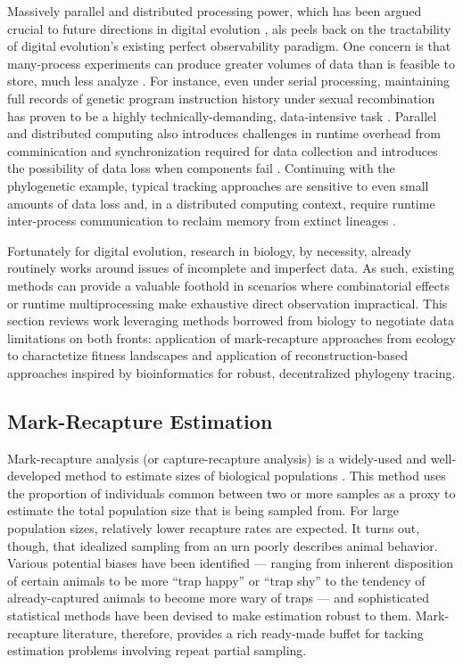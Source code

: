 Massively parallel and distributed processing power, which has been argued crucial to future directions in digital evolution \citep{moreno2022best,ackleyTODO}, als peels back on the tractability of digital evolution's existing perfect observability paradigm.
One concern is that many-process experiments can produce greater volumes of data than is feasible to store, much less analyze \citep{klasky2021data}.
For instance, even under serial processing, maintaining full records of genetic program instruction history under sexual recombination has proven to be a highly technically-demanding, data-intensive task \citep{mcphee2016using}.
Parallel and distributed computing also introduces challenges in runtime overhead from comminication and synchronization required for data collection and introduces the possibility of data loss when components fail \citep{snir2014addressing}.
Continuing with the phylogenetic example, typical tracking approaches are sensitive to even small amounts of data loss and, in a distributed computing context, require runtime inter-process communication to reclaim memory from extinct lineages \citep{moreno2024algorithms}.

Fortunately for digital evolution, research in biology, by necessity, already routinely works around issues of incomplete and imperfect data.
As such, existing methods can provide a valuable foothold in scenarios where combinatorial effects or runtime multiprocessing make exhaustive direct observation impractical.
This section reviews work leveraging methods borrowed from biology to negotiate data limitations on both fronts: application of mark-recapture approaches from ecology to charactetize fitness landscapes and application of reconstruction-based approaches inspired by bioinformatics for robust, decentralized phylogeny tracing.

\subsection{Mark-Recapture Estimation}

Mark-recapture analysis (or capture-recapture analysis) is a widely-used and well-developed method to estimate sizes of biological populations \citep{amstrup2010handbook}.
This method uses the proportion of individuals common between two or more samples as a proxy to estimate the total population size that is being sampled from.
For large population sizes, relatively lower recapture rates are expected.
It turns out, though, that idealized sampling from an urn poorly describes animal behavior.
Various potential biases have been identified --- ranging from inherent disposition of certain animals to be more ``trap happy'' or ``trap shy'' to the tendency of already-captured animals to become more wary of traps --- and sophisticated statistical methods have been devised to make estimation robust to them.
Mark-recapture literature, therefore, provides a rich ready-made buffet for tacking estimation problems involving repeat partial sampling.

